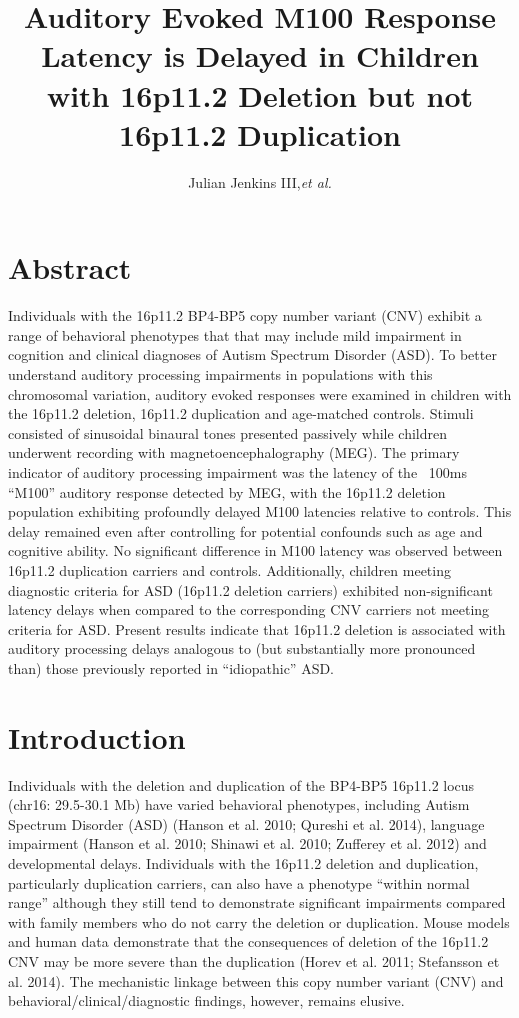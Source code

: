 \documentclass{article}
\title{\textbf{Auditory Evoked M100 Response Latency is Delayed in Children with 16p11.2 Deletion but not 16p11.2 Duplication}}
\author{Julian Jenkins III,\emph{et al.}}
\begin{document}
\maketitle


\section*{Abstract}
Individuals with the 16p11.2 BP4-BP5 copy number variant (CNV) exhibit a range of behavioral phenotypes that that may include mild impairment in cognition and clinical diagnoses of Autism Spectrum Disorder (ASD). To better understand auditory processing impairments in populations with this chromosomal variation, auditory evoked responses were examined in children with the 16p11.2 deletion, 16p11.2 duplication and age-matched controls. Stimuli consisted of sinusoidal binaural tones presented passively while children underwent recording with magnetoencephalography (MEG). The primary indicator of auditory processing impairment was the latency of the ~100ms “M100” auditory response detected by MEG, with the 16p11.2 deletion population exhibiting profoundly delayed M100 latencies relative to controls. This delay remained even after controlling for potential confounds such as age and cognitive ability.  No significant difference in M100 latency was observed between 16p11.2 duplication carriers and controls. Additionally, children meeting diagnostic criteria for ASD (16p11.2 deletion carriers) exhibited non-significant latency delays when compared to the corresponding CNV carriers not meeting criteria for ASD. Present results indicate that 16p11.2 deletion is associated with auditory processing delays analogous to (but substantially more pronounced than) those previously reported in “idiopathic” ASD.

\section*{Introduction}
Individuals with the deletion and duplication of the BP4-BP5 16p11.2 locus (chr16: 29.5-30.1 Mb) have varied behavioral phenotypes, including Autism Spectrum Disorder (ASD) (Hanson et al. 2010; Qureshi et al. 2014), language impairment (Hanson et al. 2010; Shinawi et al. 2010; Zufferey et al. 2012) and developmental delays. Individuals with the 16p11.2 deletion and duplication, particularly duplication carriers, can also have a phenotype “within normal range” although they still tend to demonstrate significant impairments compared with family members who do not carry the deletion or duplication. Mouse models and human data demonstrate that the consequences of deletion of the 16p11.2 CNV may be more severe than the duplication (Horev et al. 2011; Stefansson et al. 2014). The mechanistic linkage between this copy number variant (CNV) and behavioral/clinical/diagnostic findings, however, remains elusive.
\medskip
\end{document}
